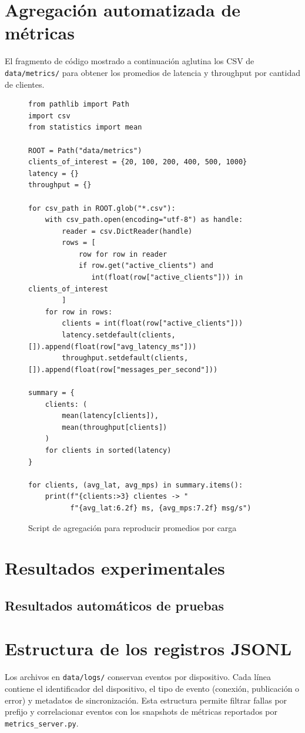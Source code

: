 \section{Agregaci\'on automatizada de m\'etricas}
\label{app:agregacion}
El fragmento de c\'odigo mostrado a continuaci\'on aglutina los CSV de \texttt{data/metrics/} para obtener los promedios de latencia y throughput por cantidad de clientes.

\begin{figure}[!t]
\centering
\scriptsize
\begin{verbatim}
from pathlib import Path
import csv
from statistics import mean

ROOT = Path("data/metrics")
clients_of_interest = {20, 100, 200, 400, 500, 1000}
latency = {}
throughput = {}

for csv_path in ROOT.glob("*.csv"):
    with csv_path.open(encoding="utf-8") as handle:
        reader = csv.DictReader(handle)
        rows = [
            row for row in reader
            if row.get("active_clients") and
               int(float(row["active_clients"])) in clients_of_interest
        ]
    for row in rows:
        clients = int(float(row["active_clients"]))
        latency.setdefault(clients, []).append(float(row["avg_latency_ms"]))
        throughput.setdefault(clients, []).append(float(row["messages_per_second"]))

summary = {
    clients: (
        mean(latency[clients]),
        mean(throughput[clients])
    )
    for clients in sorted(latency)
}

for clients, (avg_lat, avg_mps) in summary.items():
    print(f"{clients:>3} clientes -> "
          f"{avg_lat:6.2f} ms, {avg_mps:7.2f} msg/s")
\end{verbatim}
\normalsize
\caption{Script de agregaci\'on para reproducir promedios por carga}
\label{lst:agregacion}
\end{figure}

\section{Resultados experimentales}
\label{sec:resultados-experimentales}
\subsection{Resultados autom\'aticos de pruebas}

\clearpage

\section{Estructura de los registros JSONL}
Los archivos en \texttt{data/logs/} conservan eventos por dispositivo. Cada l\'inea contiene el identificador del dispositivo, el tipo de evento (conexi\'on, publicaci\'on o error) y metadatos de sincronizaci\'on. Esta estructura permite filtrar fallas por prefijo y correlacionar eventos con los snapshots de m\'etricas reportados por \texttt{metrics\_server.py}.
